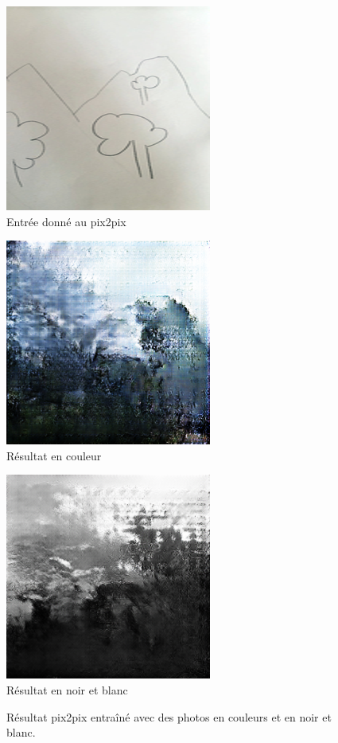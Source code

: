 \documentclass[a4paper, 12pt]{report}
\begin{document}
\begin{figure}[!h]
\centering 
\begin{minipage}{0.25\textwidth}
\centering
\includegraphics[scale=0.3]{images/croquis_2_real_A.png}
\\Entrée donné au pix2pix
\\
\end{minipage}
\begin{minipage}{0.25\textwidth}
\centering
\includegraphics[scale=0.3]{images/croquis_2_fake_B.png}
\\Résultat en couleur
\end{minipage}
\begin{minipage}{0.25\textwidth}
\centering
\includegraphics[scale=0.3]{images/croquis_2_fake_B-gray.png}
\\Résultat en noir et blanc
\end{minipage}
\caption{\centering Résultat pix2pix entraîné avec des photos en couleurs et en noir et blanc.}
\label{color-vs-gray}
\end{figure}
\end{document}
